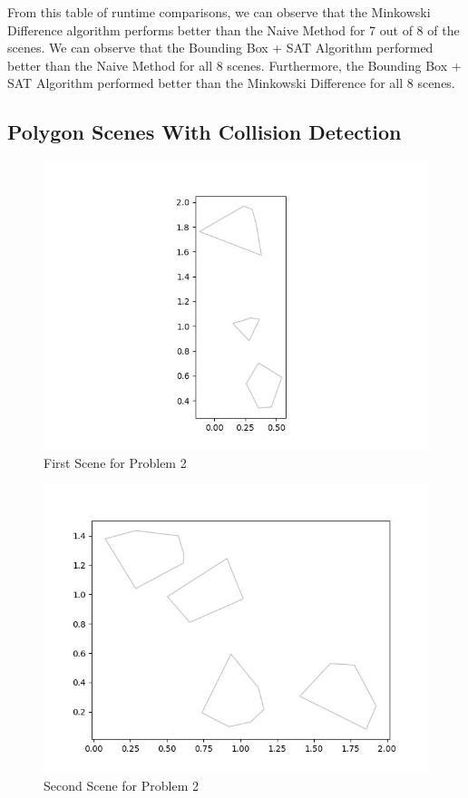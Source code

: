 \documentclass{article}
\begin{document}
From this table of runtime comparisons, we can observe that the Minkowski Difference algorithm performs better than the Naive Method for 7 out of 8 of the scenes. We can observe that the Bounding Box + SAT Algorithm performed better than the Naive Method for all 8 scenes. Furthermore, the Bounding Box + SAT Algorithm performed better than the Minkowski Difference for all 8 scenes. 

\subsection{Polygon Scenes With Collision Detection} 

\begin{figure}[h!]
	\includegraphics[width= 0.9 \linewidth]{Problem2_scene1.jpg}
	\centering
	\caption{First Scene for Problem 2}
	\label{Problem2_scene1.jpg}
\end{figure}

\begin{figure}[h!]
	\includegraphics[width= 0.9 \linewidth]{Problem2_scene2.jpg}
	\centering
	\caption{Second Scene for Problem 2}
	\label{Problem2_scene2.jpg}
\end{figure}
\end{document}

